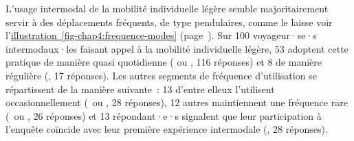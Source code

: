 \begin{refsegment}
L'usage intermodal de la mobilité individuelle légère semble majoritairement servir à des déplacements fréquents, de type pendulaires, comme le laisse voir l'\hyperref[fig-chap4:frequence-modes]{illustration~\ref{fig-chap4:frequence-modes}} (page~\pageref{fig-chap4:frequence-modes}). Sur 100 voyageur·se·s intermodaux·les faisant appel à la mobilité individuelle légère, 53 adoptent cette pratique de manière quasi quotidienne ( ou , 116 réponses) et 8 de manière régulière (, 17  réponses). Les autres segments de fréquence d'utilisation se répartissent de la manière suivante~: 13 d'entre elleux l'utilisent occasionnellement (~ou , 28  réponses), 12 autres maintiennent une fréquence rare (~ou , 26  réponses) et 13 répondant·e·s signalent que leur participation à l'enquête coïncide avec leur première expérience intermodale (, 28  réponses).%


\end{refsegment}
